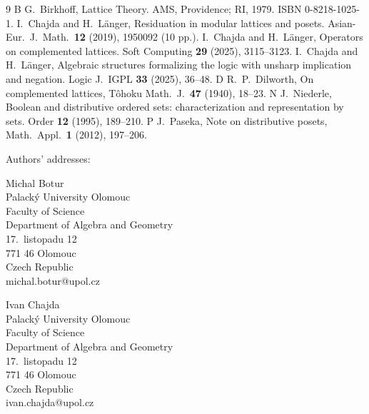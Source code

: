 \documentclass[12pt]{article}
\begin{document}




\begin{thebibliography}9
\bibitem B
G.~Birkhoff, Lattice Theory. AMS, Providence; RI, 1979. ISBN 0-8218-1025-1.
I.~Chajda and H.~L\"anger, Residuation in modular lattices and posets. Asian-Eur.\ J.\ Math.\ {\bf12} (2019), 1950092 (10 pp.).
I.~Chajda and H.~L\"anger, Operators on complemented lattices. Soft Computing {\bf29} (2025), 3115--3123.
I.~Chajda and H.~L\"anger, Algebraic structures formalizing the logic with unsharp implication and negation. Logic J.\ IGPL {\bf33} (2025), 36--48.
\bibitem D
R.~P.~Dilworth, On complemented lattices, T\^ohoku Math.\ J.\ {\bf47} (1940), 18--23.
\bibitem N
J.~Niederle, Boolean and distributive ordered sets: characterization and representation by sets. Order {\bf12} (1995), 189--210.
\bibitem P
J.~Paseka, Note on distributive posets, Math.\ Appl.\ {\bf1} (2012), 197--206.
\end{thebibliography}

Authors' addresses:

Michal Botur \\
Palack\'y University Olomouc \\
Faculty of Science \\
Department of Algebra and Geometry \\
17.\ listopadu 12 \\
771 46 Olomouc \\
Czech Republic \\
michal.botur@upol.cz

Ivan Chajda \\
Palack\'y University Olomouc \\
Faculty of Science \\
Department of Algebra and Geometry \\
17.\ listopadu 12 \\
771 46 Olomouc \\
Czech Republic \\
ivan.chajda@upol.cz
\end{document}
